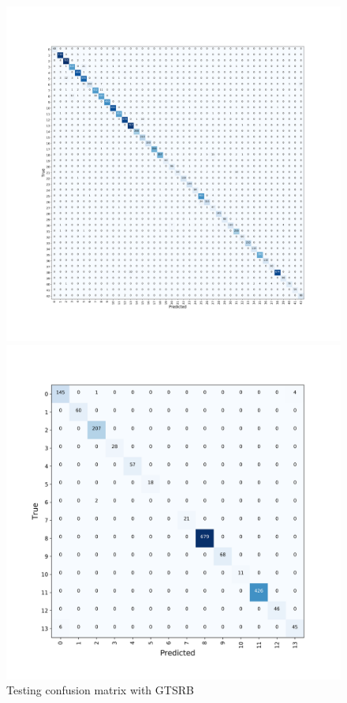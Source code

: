 \documentclass{article}
\begin{document}
\begin{figure}
  \centering
  \begin{minipage}{.5\textwidth}
    \includegraphics[width=1.0\linewidth]{confusion_matrix_f.png}
    \centering
    \caption{Testing confusion matrix with GTSRB}
    \label{fig:fig_11}
  \end{minipage}
  \begin{minipage}{.5\textwidth}
    \includegraphics[width=1.0\linewidth]{confusion_matrix.png}

\end{minipage}
\end{figure}
\end{document}
